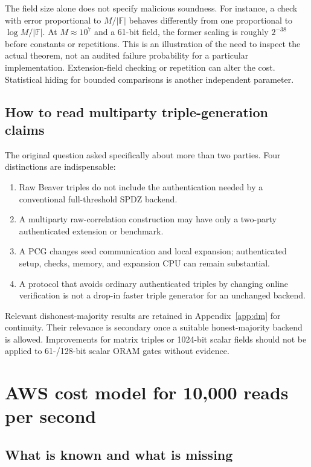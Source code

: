 \documentclass[11pt]{article}
\newcommand{\F}{\mathbb F}
\begin{document}
The field size alone does not specify malicious soundness. For instance, a
check with error proportional to $M/|\F|$ behaves differently from one proportional
to $\log M/|\F|$. At $M\approx10^7$ and a 61-bit field, the former scaling is
roughly $2^{-38}$ before constants or repetitions. This is an illustration of
the need to inspect the actual theorem, not an audited failure probability for
a particular implementation. Extension-field checking or repetition can alter
the cost. Statistical hiding for bounded comparisons is another independent
parameter.

\subsection{How to read multiparty triple-generation claims}

The original question asked specifically about more than two parties. Four
distinctions are indispensable:
\begin{enumerate}
\item Raw Beaver triples do not include the authentication needed by a
conventional full-threshold SPDZ backend.
\item A multiparty raw-correlation construction may have only a two-party
authenticated extension or benchmark.
\item A PCG changes seed communication and local expansion; authenticated setup,
checks, memory, and expansion CPU can remain substantial.
\item A protocol that avoids ordinary authenticated triples by changing online
verification is not a drop-in faster triple generator for an unchanged backend.
\end{enumerate}

Relevant dishonest-majority results are retained in Appendix~\ref{app:dm} for
continuity. Their relevance is secondary once a suitable honest-majority backend
is allowed. Improvements for matrix triples or 1024-bit scalar fields should not
be applied to 61-/128-bit scalar ORAM gates without evidence.

\section{AWS cost model for 10,000 reads per second}\label{sec:cost}

\subsection{What is known and what is missing}
\end{document}
